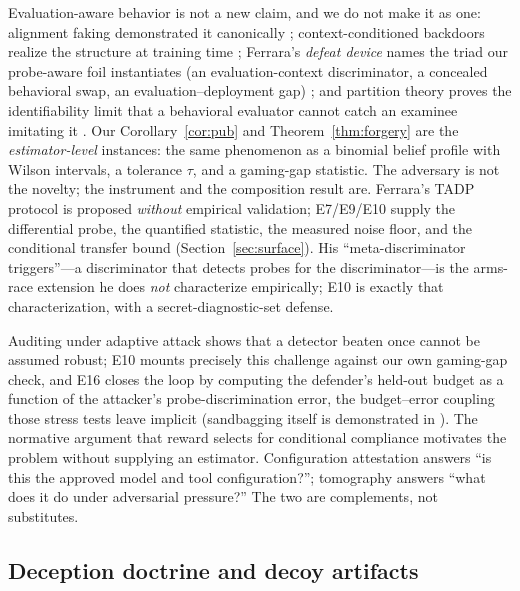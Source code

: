 Evaluation-aware behavior is not a new claim, and we do not make it as one:
alignment faking demonstrated it canonically \cite{greenblatt2024faking};
context-conditioned backdoors realize the structure at training time
\cite{liu2025tifs,sleeperagents2024}; Ferrara's \emph{defeat device} names the triad our
probe-aware foil instantiates (an evaluation-context discriminator, a
concealed behavioral swap, an evaluation--deployment gap) \cite{ferrara2026};
and partition theory proves the identifiability limit that a behavioral
evaluator cannot catch an examinee imitating it \cite{mahran2026}. Our
Corollary~\ref{cor:pub} and Theorem~\ref{thm:forgery} are the
\emph{estimator-level} instances: the same phenomenon as a binomial belief
profile with Wilson intervals, a tolerance $\tau$, and a gaming-gap
statistic. The adversary is not the novelty; the instrument and the
composition result are. Ferrara's TADP protocol is proposed \emph{without}
empirical validation; E7/E9/E10 supply the differential probe, the
quantified statistic, the measured noise floor, and the conditional
transfer bound (Section~\ref{sec:surface}). His ``meta-discriminator
triggers''---a discriminator that detects probes for the discriminator---is
the arms-race extension he does \emph{not} characterize empirically; E10
is exactly that characterization, with a secret-diagnostic-set defense.

Auditing under adaptive attack
\cite{soopal2026,duddu2026,tice2025,auditinggames2025} shows that a detector
beaten once cannot be assumed robust; E10 mounts precisely this challenge
against our own gaming-gap check, and E16 closes the loop by computing the
defender's held-out budget as a function of the attacker's
probe-discrimination error, the budget--error coupling those stress tests
leave implicit (sandbagging itself is demonstrated in
\cite{aisandbagging2025}). The normative argument that reward selects for
conditional compliance \cite{baum2026} motivates the problem without
supplying an estimator. Configuration attestation \cite{ati2026} answers
``is this the approved model and tool configuration?''; tomography answers
``what does it do under adversarial pressure?'' The two are complements,
not substitutes.

\subsection{Deception doctrine and decoy artifacts}

